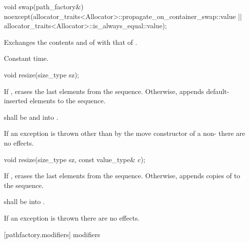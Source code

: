 \begin{itemdecl}
	void swap(path_factory&)
	noexcept(allocator_traits<Allocator>::propagate_on_container_swap::value ||
	allocator_traits<Allocator>::is_always_equal::value);
\end{itemdecl}
\begin{itemdescr}
	\pnum
	\effects
	Exchanges the contents and
	of
	with that of .
	
	\pnum
	\complexity
	Constant time.
\end{itemdescr}

\begin{itemdecl}
	void resize(size_type sz);
\end{itemdecl}
\begin{itemdescr}
	\pnum
	\effects
	If , erases the last  elements
	from the sequence. Otherwise, appends  default-inserted 
	elements to the sequence.
	
	\pnum
	\requires
	 shall be
	 and  into .
	
	\pnum
	\remarks
	If an exception is thrown other than by the move constructor of a 
	non-
	 there are no effects.
\end{itemdescr}

\begin{itemdecl}
	void resize(size_type sz, const value_type& c);
\end{itemdecl}
\begin{itemdescr}
	\pnum
	\effects
	If , erases the last  elements
	from the sequence. Otherwise,
	appends  copies of  to the sequence.
	
	\pnum
	\requires
	 shall be  into .
	
	\pnum
	\remarks
	If an exception is thrown there are no effects.
\end{itemdescr}

 [pathfactory.modifiers] { modifiers}

